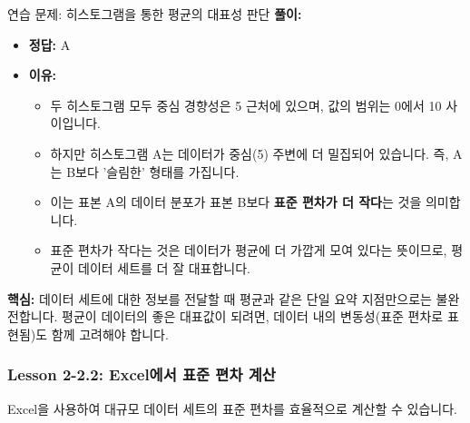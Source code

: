 \documentclass[11pt,a4paper]{article}
\begin{document}
\begin{examplebox}{연습 문제: 히스토그램을 통한 평균의 대표성 판단}
\textbf{풀이:}
\begin{itemize}
    \item \textbf{정답:} A
    \item \textbf{이유:}
    \begin{itemize}
        \item 두 히스토그램 모두 중심 경향성은 5 근처에 있으며, 값의 범위는 0에서 10 사이입니다.
        \item 하지만 히스토그램 A는 데이터가 중심(5) 주변에 더 밀집되어 있습니다. 즉, A는 B보다 '슬림한' 형태를 가집니다.
        \item 이는 표본 A의 데이터 분포가 표본 B보다 \textbf{표준 편차가 더 작다}는 것을 의미합니다.
        \item 표준 편차가 작다는 것은 데이터가 평균에 더 가깝게 모여 있다는 뜻이므로, 평균이 데이터 세트를 더 잘 대표합니다.
    \end{itemize}
\end{itemize}
\textbf{핵심:} 데이터 세트에 대한 정보를 전달할 때 평균과 같은 단일 요약 지점만으로는 불완전합니다. 평균이 데이터의 좋은 대표값이 되려면, 데이터 내의 변동성(표준 편차로 표현됨)도 함께 고려해야 합니다.
\end{examplebox}

\newpage
\subsubsection*{Lesson 2-2.2: Excel에서 표준 편차 계산}
Excel을 사용하여 대규모 데이터 세트의 표준 편차를 효율적으로 계산할 수 있습니다.
\end{document}

